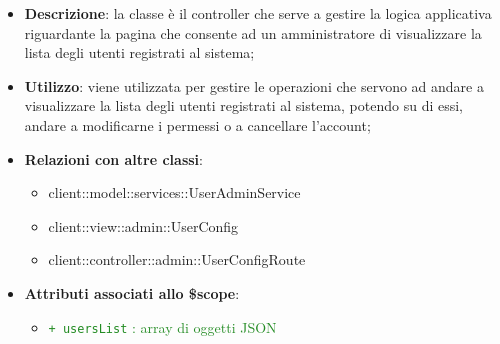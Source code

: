 			\begin{itemize}
				\item \textbf{Descrizione}: la classe è il controller che serve a gestire la logica applicativa riguardante la pagina che consente ad un amministratore di visualizzare la lista degli utenti registrati al sistema;
				\item \textbf{Utilizzo}: viene utilizzata per gestire le operazioni che servono ad andare a visualizzare la lista degli utenti registrati al sistema, potendo su di essi, andare a modificarne i permessi o a cancellare l'account;
				\item \textbf{Relazioni con altre classi}:
					\begin{itemize}
						\item client::model::services::UserAdminService
						\item client::view::admin::UserConfig
						\item client::controller::admin::UserConfigRoute
					\end{itemize}

				\item \textbf{Attributi associati allo \$scope}:
					\begin{itemize}
						\item \textcolor{forestgreen}{\texttt{+ usersList} : array di oggetti JSON}

					\end{itemize}


\end{itemize}
